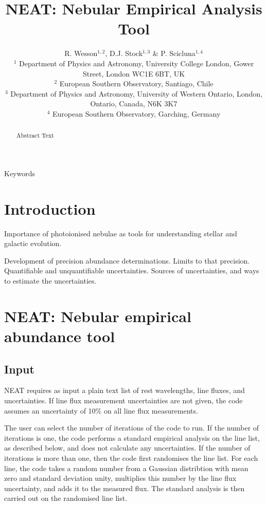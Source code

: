 \documentclass[useAMS,usenatbib]{mn2e}
\title[NEAT]{NEAT: Nebular Empirical Analysis Tool} %
\author[R. Wesson et al.]{R. Wesson$^{1,2}$, D.J. Stock$^{1,3}$ \& P. Scicluna$^{1,4}$\\

$^1$ Department of Physics and Astronomy, University College London, Gower Street, London WC1E 6BT, UK\\
$^2$ European Southern Observatory, Santiago, Chile \\ %
$^3$ Department of Physics and Astronomy, University of Western Ontario, London, Ontario, Canada, N6K 3K7\\
$^4$ European Southern Observatory, Garching, Germany\\ %
}
\begin{document}
\date{}

\pagerange{\pageref{firstpage}--\pageref{lastpage}} 

\maketitle

\label{firstpage}

\begin{abstract}
Abstract Text
\end{abstract}

\begin{keywords}
Keywords
\end{keywords}

\section{Introduction}

Importance of photoionised nebulae as tools for understanding stellar and galactic evolution.

Development of precision abundance determinations.  Limits to that precision.  Quantifiable and unquantifiable uncertainties.  Sources of uncertainties, and ways to estimate the uncertainties.

\section{NEAT: Nebular empirical abundance tool}

\subsection{Input}

NEAT requires as input a plain text list of rest wavelengths, line fluxes, and uncertainties.  If line flux measurement uncertainties are not given, the code assumes an uncertainty of 10\% on all line flux measurements.

The user can select the number of iterations of the code to run.  If the number of iterations is one, the code performs a standard empirical analysis on the line list, as described below, and does not calculate any uncertainties.  If the number of iterations is more than one, then the code first randomises the line list.  For each line, the code takes a random number from a Gaussian distribtion with mean zero and standard deviation unity, multiplies this number by the line flux uncertainty, and adds it to the measured flux.  The standard analysis is then carried out on the randomised line list.
\end{document}
